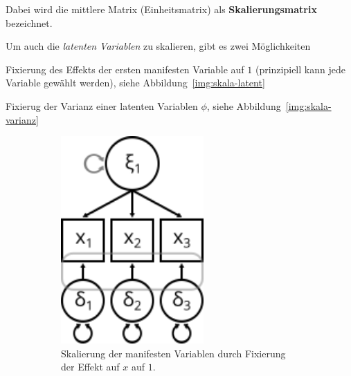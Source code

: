 \documentclass{article}
\numberwithin{equation}{section}
\begin{document}
Dabei wird die mittlere Matrix (Einheitsmatrix) als \textbf{Skalierungsmatrix} bezeichnet.

Um auch die \emph{latenten Variablen} zu skalieren, gibt es zwei Möglichkeiten

\begin{compactitem}
\item Fixierung des Effekts der ersten manifesten Variable auf $1$ (prinzipiell kann jede Variable gewählt werden), siehe Abbildung~\ref{img:skala-latent}
\item Fixierug der Varianz einer latenten Variablen $\phi$, siehe Abbildung~\ref{img:skala-varianz}
\end{compactitem}

\begin{figure}
  \centering
  \captionsetup{justification=centering}
  \begin{subfigure}[b]{0.32\textwidth}
    \centering
    \includegraphics[width=0.6\textwidth]{images/sem/skala-x.png}
    \caption{Skalierung der manifesten Variablen durch Fixierung der Effekt auf $x$ auf $1$.}
    \label{img:skala-x}
  \end{subfigure}
  \begin{subfigure}[b]{0.32\textwidth}
    \centering

\end{subfigure}
\end{figure}
\end{document}
